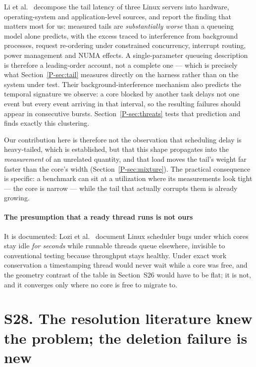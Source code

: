\documentclass[10pt,journal,onecolumn]{IEEEtran}
\newcommand{\mainThreats}{\ref{P-sec:threats}}        %
\newcommand{\mainRareState}{\ref{P-sec:mixture}}       %
\newcommand{\mainSpectrum}{\ref{P-sec:tail}}        %
\begin{document}
Li et al.~\cite{li2014tales} decompose the tail latency of three Linux servers into hardware,
operating-system and application-level sources, and report the finding that matters most for us:
measured tails are \emph{substantially worse} than a queueing model alone predicts, with the
excess traced to interference from background processes, request re-ordering under constrained
concurrency, interrupt routing, power management and NUMA effects. A single-parameter queueing
description is therefore a leading-order account, not a complete one --- which is precisely what Section~\mainSpectrum{} measures directly on the harness rather than on the system under
test. Their background-interference mechanism also predicts the temporal signature we observe: a
core blocked by another task delays not one event but every event arriving in that interval, so
the resulting failures should appear in consecutive bursts. Section~\mainThreats{} tests that prediction and finds exactly this clustering.

Our contribution here is therefore not the observation that scheduling delay is heavy-tailed,
which is established, but that this shape propagates into the \emph{measurement} of an unrelated
quantity, and that load moves the tail's weight far faster than the core's width (Section~\mainRareState{}). The practical consequence is specific: a benchmark can sit at a
utilization where its measurements look tight --- the core is narrow --- while the tail that
actually corrupts them is already growing.


\paragraph{The presumption that a ready thread runs is not ours} It is documented: Lozi et al.~\cite{lozi2016wastedcores} document Linux
scheduler bugs under which cores stay idle \emph{for seconds} while runnable threads
queue elsewhere, invisible to conventional testing because throughput stays healthy. Under
exact work conservation a timestamping thread would never wait while a core was free, and the
geometry contrast of the table in Section~S26 would have to be flat; it is
not, and it converges only where no core is free to migrate to.

\section{S28. The resolution literature knew the problem; the deletion failure is new}
\end{document}
